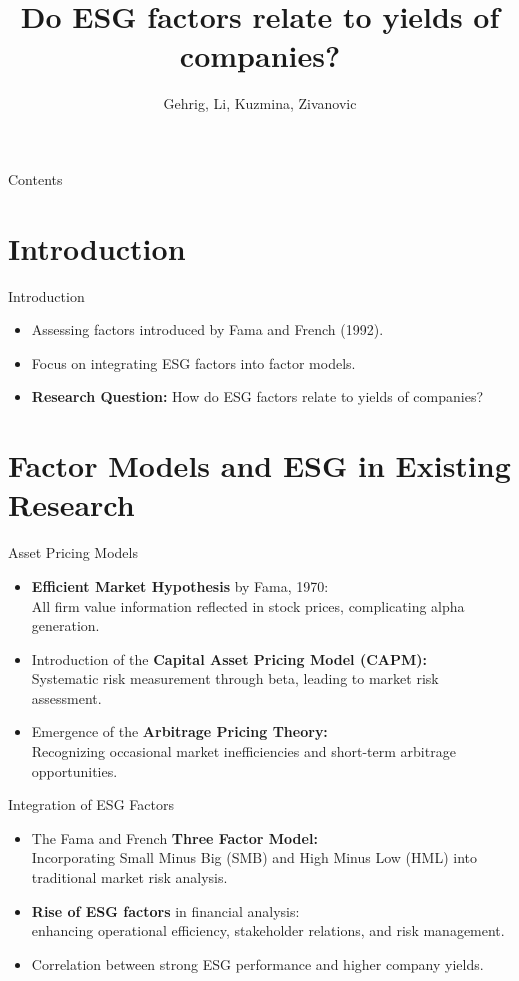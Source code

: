 \documentclass{beamer}
\title[]{Do ESG factors relate to yields of companies?}
\author{Gehrig, Li, Kuzmina, Zivanovic}
\begin{document}
\begin{frame}
  \titlepage
\end{frame}

\begin{frame}{Contents}
  \tableofcontents
\end{frame}

\section{Introduction}
\begin{frame}{Introduction}
  \begin{itemize}
    \item Assessing factors introduced by Fama and French (1992).
    \item Focus on integrating ESG factors into factor models.
    \item \textbf{Research Question:} How do ESG factors relate to yields of companies?
  \end{itemize}
\end{frame}

\section{Factor Models and ESG in Existing Research}
\begin{frame}{Asset Pricing Models}
  \begin{itemize}
    \item \textbf{Efficient Market Hypothesis} by Fama, 1970: \\ All firm value information reflected in stock prices, complicating alpha generation.
    \item Introduction of the \textbf{Capital Asset Pricing Model (CAPM):}\\
    Systematic risk measurement through beta, leading to market risk assessment.
    \item Emergence of the \textbf{Arbitrage Pricing Theory:} \\
    Recognizing occasional market inefficiencies and short-term arbitrage opportunities.
  \end{itemize}
\end{frame}

\begin{frame}{Integration of ESG Factors}
  \begin{itemize}
    \item The Fama and French \textbf{Three Factor Model:} \\ Incorporating Small Minus Big (SMB) and High Minus Low (HML) into traditional market risk analysis.
    \item \textbf{Rise of ESG factors} in financial analysis: \\
     enhancing operational efficiency, stakeholder relations, and risk management.
    \item Correlation between strong ESG performance and higher company yields.
  \end{itemize}
\end{frame}
\end{document}
